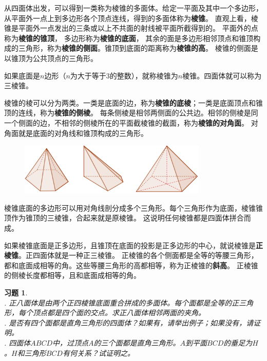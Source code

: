 \documentclass[12pt,UTF8]{ctexbook}
\newtheorem{xt}{习题}[section]
\begin{document}
从四面体出发，可以得到一类称为棱锥的多面体。给定一平面及其中一个多边形，
从平面外一点上到多边形各个顶点连线，得到的多面体称为\textbf{棱锥}。
直观上看，棱锥是平面外一点发出的三条或以上不共面的射线被平面所截得到的。
平面外的点称为\textbf{棱锥的锥顶}，
多边形称为\textbf{棱锥的底面}，
其余的面是多边形相邻顶点和锥顶构成的三角形，称为\textbf{棱锥的侧面}。锥顶到底面的距离称为\textbf{棱锥的高}。
棱锥的侧面是以锥顶为公共顶点的三角形。

如果底面是$n$边形（$n$为大于等于$3$的整数），就称棱锥为$n$棱锥。四面体就可以称为三棱锥。

棱锥的棱可以分为两类。一类是底面的边，称为\textbf{棱锥的底棱}；一类是底面顶点和锥顶的连线，称为\textbf{棱锥的侧棱}。
每条侧棱是相邻两侧面的公共边。相邻的侧棱是同一个侧面的边，不相邻的侧棱所在的平面截棱锥的截面，称为\textbf{棱锥的对角面}。
对角面就是底面的对角线和锥顶构成的三角形。

\begin{figure}[h] 
    \centering
    \includegraphics[width=0.8\textwidth]{tu/棱锥1.png}
\end{figure}

棱锥底面的多边形可以用对角线剖分成多个三角形。每个三角形作为底面，棱锥锥顶作为锥顶的三棱锥，合起来就是原棱锥。
这说明任何棱锥都是四面体拼合而成。

如果棱锥底面是正多边形，且锥顶在底面的投影是正多边形的中心，就说棱锥是\textbf{正棱锥}。正四面体就是一种正三棱锥。
正棱锥的各个侧面都是全等的等腰三角形，都和底面成相等的角。这些等腰三角形的高都相等，称为正棱锥的\textbf{斜高}。
正棱锥的侧棱长度都相等，且和底面成相等的角。
\begin{xt}
    \mbox{}\\
    . 正八面体是由两个正四棱锥底面重合拼成的多面体。每个面都是全等的正三角形，每个顶点都是四个面的交点。求正八面体相邻两面的夹角。\\
    . 是否有四个面都是直角三角形的四面体？如果有，请举出例子；如果没有，请证明。\\
    . 四面体$ABCD$中，过顶点$A$的三个面都是直角三角形。$A$到平面$BCD$的垂足为$H$。$H$和三角形$BCD$有何关系？试证明之。
\end{xt}
\end{document}
